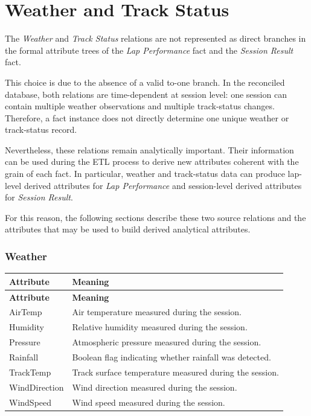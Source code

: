\documentclass[a4paper,11pt]{article}
\begin{document}
	
	
	\section{Weather and Track Status}
	

	The \textit{Weather} and \textit{Track Status} relations are not represented as direct
	branches in the formal attribute trees of the \textit{Lap Performance} fact and the
	\textit{Session Result} fact.
	
	This choice is due to the absence of a valid to-one branch. In the reconciled database,
	both relations are time-dependent at session level: one session can contain multiple
	weather observations and multiple track-status changes. Therefore, a fact instance does
	not directly determine one unique weather or track-status record.
	
	Nevertheless, these relations remain analytically important. Their information can be
	used during the ETL process to derive new attributes coherent with the grain of each
	fact. In particular, weather and track-status data can produce lap-level derived attributes
	for \textit{Lap Performance} and session-level derived attributes for
	\textit{Session Result}.
	
	For this reason, the following sections describe these two source relations and the
	attributes that may be used to build derived analytical attributes.
		
	
	\subsubsection{Weather }
	
	
	\begin{longtable}{|p{4cm}|p{10.8cm}|}
		\hline
		\textbf{Attribute} & \textbf{Meaning} \\
		\hline
		\endfirsthead
		
		\hline
		\textbf{Attribute} & \textbf{Meaning} \\
		\hline
		\endhead
		
		AirTemp & Air temperature measured during the session. \\ \hline
		
		Humidity & Relative humidity measured during the session. \\ \hline
		
		Pressure & Atmospheric pressure measured during the session. \\ \hline
		
		Rainfall & Boolean flag indicating whether rainfall was detected. \\ \hline
		
		TrackTemp & Track surface temperature measured during the session. \\ \hline
		
		WindDirection & Wind direction measured during the session. \\ \hline
		
		WindSpeed & Wind speed measured during the session. \\ \hline
	\end{longtable}
	
\end{document}
